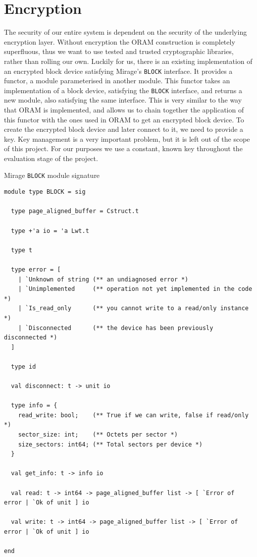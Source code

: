 \documentclass[12pt,a4paper,twoside,openright]{report}
\begin{document}
\section{Encryption}
\label{sec:encryption}

The security of our entire system is dependent on the security of the underlying encryption layer. Without encryption the ORAM construction is completely superfluous, thus we want to use tested and trusted cryptographic libraries, rather than rolling our own. Luckily for us, there is an existing implementation of an encrypted block device satisfying Mirage's \texttt{BLOCK} interface. It provides a functor, a module parameterised in another module. This functor takes an implementation of a block device, satisfying the \texttt{BLOCK} interface, and returns a new module, also satisfying the same interface. This is very similar to the way that ORAM is implemented, and allows us to chain together the application of this functor with the ones used in ORAM to get an encrypted block device. To create the encrypted block device and later connect to it, we need to provide a key. Key management is a very important problem, but it is left out of the scope of this project. For our purposes we use a constant, known key throughout the evaluation stage of the project.

\begin{listing}[t]
\caption{Mirage \texttt{BLOCK} module signature}
\label{lst:blocksig}
\vskip 10pt
\begin{verbatim}
module type BLOCK = sig

  type page_aligned_buffer = Cstruct.t

  type +'a io = 'a Lwt.t

  type t

  type error = [
    | `Unknown of string (** an undiagnosed error *)
    | `Unimplemented     (** operation not yet implemented in the code *)
    | `Is_read_only      (** you cannot write to a read/only instance *)
    | `Disconnected      (** the device has been previously disconnected *)
  ]

  type id

  val disconnect: t -> unit io

  type info = {
    read_write: bool;    (** True if we can write, false if read/only *)
    sector_size: int;    (** Octets per sector *)
    size_sectors: int64; (** Total sectors per device *)
  }

  val get_info: t -> info io

  val read: t -> int64 -> page_aligned_buffer list -> [ `Error of error | `Ok of unit ] io

  val write: t -> int64 -> page_aligned_buffer list -> [ `Error of error | `Ok of unit ] io

end
\end{verbatim}
\end{listing}
\end{document}
